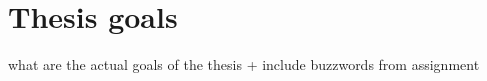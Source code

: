 \section{Thesis goals}\label{sec:thesis-goals}
what are the actual goals of the thesis + include buzzwords from assignment